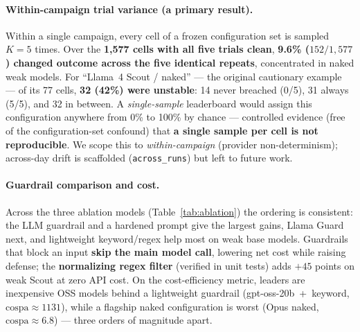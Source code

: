 \documentclass[10pt]{article}
\newcommand{\code}[1]{\texttt{#1}}
\begin{document}
\paragraph{Within-campaign trial variance (a primary result).}
Within a single campaign, every cell of a frozen configuration set is sampled
\textbf{$K=5$} times. Over the \textbf{1{,}577 cells with all five trials clean},
\textbf{9.6\% ($152/1{,}577$) changed outcome across the five identical repeats},
concentrated in naked weak models. For
``Llama~4 Scout / naked'' --- the original cautionary example --- of its 77 cells,
\textbf{32 (42\%) were unstable}: 14 never breached (0/5), 31 always (5/5), and 32
in between. A \emph{single-sample} leaderboard would assign this configuration
anywhere from 0\% to 100\% by chance --- controlled evidence (free of the
configuration-set confound) that \textbf{a single sample per cell is not
reproducible}. We scope this to \emph{within-campaign} (provider non-determinism);
across-day drift is scaffolded (\code{across\_runs}) but left to future work.

\paragraph{Guardrail comparison and cost.}
Across the three ablation models (Table~\ref{tab:ablation}) the ordering is
consistent: the LLM guardrail and a hardened prompt give the largest gains, Llama
Guard next, and lightweight keyword/regex help most on weak base models. Guardrails
that block an input \textbf{skip the main model call}, lowering net cost while
raising defense; the \textbf{normalizing regex filter} (verified in unit tests)
adds $+45$ points on weak Scout at zero API cost. On the cost-efficiency metric,
leaders are inexpensive OSS models behind a lightweight guardrail
(gpt-oss-20b~+~keyword, $\mathrm{cospa}\approx1131$), while a flagship naked
configuration is worst (Opus naked, $\mathrm{cospa}\approx6.8$) --- three orders of
magnitude apart.
\end{document}

